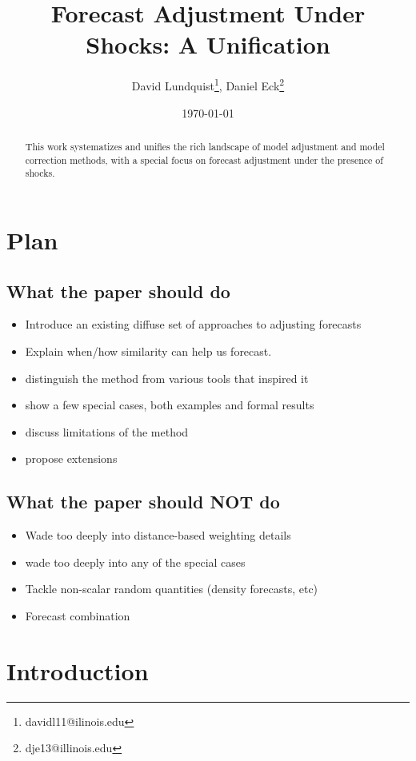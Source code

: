 \documentclass[11pt]{article}
\title{Forecast Adjustment Under Shocks: A Unification}
\author{David Lundquist\thanks{davidl11@ilinois.edu}, Daniel Eck\thanks{dje13@illinois.edu} }
\affil{Department of Statistics, University of Illinois at Urbana-Champaign}
\date{\today}
\theoremstyle{definition}
\begin{document}
\maketitle

\begin{abstract} 
This work systematizes and unifies the rich landscape of model adjustment and model correction methods, with a special focus on forecast adjustment under the presence of shocks.


\end{abstract}

\section{Plan}

\subsection{What the paper should do}

\begin{itemize}
  \item Introduce an existing diffuse set of approaches to adjusting forecasts
  \item Explain when/how similarity can help us forecast.
  \item distinguish the method from various tools that inspired it
  \item show a few special cases, both examples and formal results
  \item discuss limitations of the method
  \item propose extensions
\end{itemize}

\subsection{What the paper should NOT do}

\begin{itemize}
  \item Wade too deeply into distance-based weighting details
  \item wade too deeply into any of the special cases
  \item Tackle non-scalar random quantities (density forecasts, etc)
  \item Forecast combination

\end{itemize}

\section{Introduction}
\end{document}
